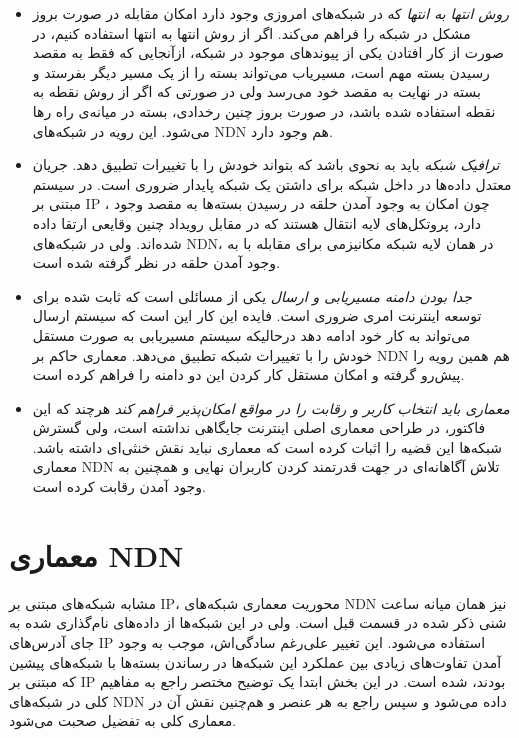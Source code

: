 \begin{itemize}
{}

\item{
\textit{روش انتها به انتها}
 که در شبکه‌های امروزی وجود دارد امکان مقابله در صورت بروز مشکل در شبکه  را فراهم می‌کند. اگر از روش انتها به انتها استفاده کنیم، در صورت از کار افتادن یکی از پیوندهای موجود در شبکه، از‌آنجایی که فقط به مقصد رسیدن بسته مهم است، مسیریاب می‌تواند بسته را از یک مسیر دیگر بفرستد و بسته در نهایت به مقصد خود می‌رسد ولی در صورتی که اگر از روش نقطه به نقطه استفاده شده باشد، در صورت بروز چنین رخدادی، بسته در میانه‌ی راه رها می‌شود. این رویه در شبکه‌های NDN هم وجود دارد. 
}

\item{
\textit{ترافیک شبکه}
باید به نحوی باشد که بتواند خودش را با تغییرات تطبیق دهد. جریان معتدل داده‌ها در داخل شبکه برای داشتن یک شبکه پایدار ضروری است. در سیستم مبتنی بر IP ، چون امکان به وجود آمدن حلقه در رسیدن بسته‌ها به مقصد وجود دارد، پروتکل‌های لایه انتقال هستند که در مقابل رویداد چنین وقایعی ارتقا داده شده‌اند. ولی در شبکه‌‌های NDN، در همان لایه شبکه مکانیزمی برای مقابله با به وجود آمدن حلقه در نظر گرفته شده است. 
}
\item{
\textit{جدا بودن دامنه مسیریابی و ارسال}
یکی از مسائلی است که ثابت شده برای توسعه اینترنت امری ضروری است. فایده این کار این است که سیستم ارسال می‌تواند به کار خود ادامه دهد درحالیکه سیستم مسیریابی به صورت مستقل خودش را با تغییرات شبکه تطبیق می‌دهد.  معماری حاکم بر NDN هم همین رویه را پیش‌رو گرفته و امکان مستقل کار کردن این دو دامنه را فراهم کرده است. 
}

\item{
\textit{ معماری باید انتخاب کاربر و رقابت را در مواقع امکان‌پذیر فراهم کند }
هرچند که این فاکتور، در طراحی معماری اصلی اینترنت جایگاهی نداشته است، ولی گسترش شبکه‌ها این قضیه را اثبات کرده است که معماری نباید نقش خنثی‌ای داشته باشد. معماری NDN تلاش آگاهانه‌ای در جهت قدرتمند کردن کاربران نهایی و همچنین به وجود آمدن رقابت کرده است. 
}

\end{itemize}

\section{معماری NDN}
مشابه شبکه‌های مبتنی بر IP، محوریت معماری شبکه‌های NDN  نیز همان میانه ساعت شنی ذکر شده در قسمت قبل است. ولی در این شبکه‌ها از داده‌‌های نام‌گذاری شده به جای آدرس‌های IP استفاده می‌‌شود. این تغییر علی‌رغم سادگی‌اش، موجب به وجود آمدن تفاوت‌های زیادی بین عملکرد این شبکه‌ها در رساندن بسته‌ها با شبکه‌های پیشین که مبتنی بر IP بودند، شده است.  در این بخش ابتدا یک توضیح مختصر راجع به مفاهیم کلی در شبکه‌های NDN داده می‌شود و سپس راجع به هر عنصر و هم‌چنین نقش آن در معماری کلی به تفضیل صحبت می‌شود. 

